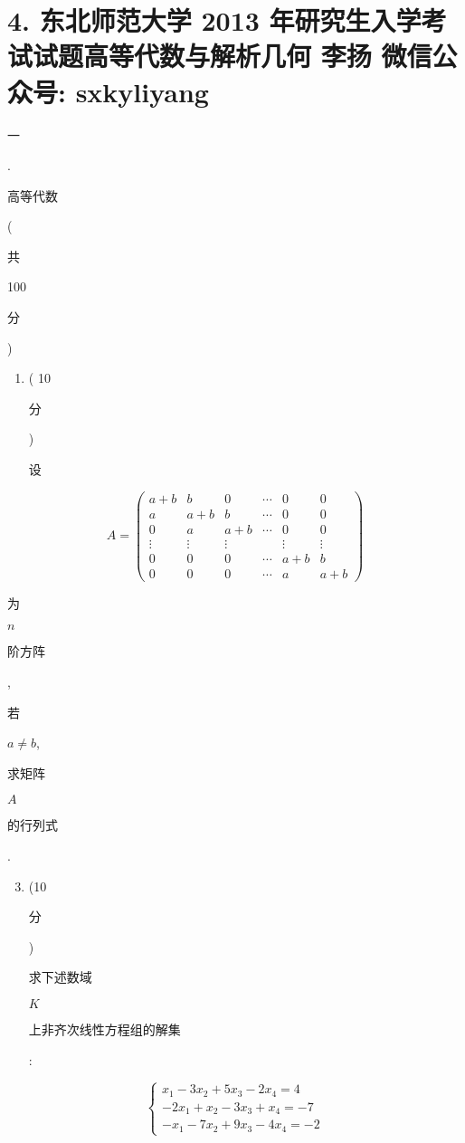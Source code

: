 \documentclass[10pt]{article}
\begin{document}
\section{4. 东北师范大学 2013 年研究生入学考试试题高等代数与解析几何 
 李扬 
 微信公众号: sxkyliyang}
\begin{CJK}{UTF8}{mj}一\end{CJK}. \begin{CJK}{UTF8}{mj}高等代数\end{CJK} (\begin{CJK}{UTF8}{mj}共\end{CJK} 100 \begin{CJK}{UTF8}{mj}分\end{CJK})

\begin{enumerate}
  \item ( 10 \begin{CJK}{UTF8}{mj}分\end{CJK}) \begin{CJK}{UTF8}{mj}设\end{CJK}
\end{enumerate}
$$
A=\left(\begin{array}{cccccc}
a+b & b & 0 & \cdots & 0 & 0 \\
a & a+b & b & \cdots & 0 & 0 \\
0 & a & a+b & \cdots & 0 & 0 \\
\vdots & \vdots & \vdots & & \vdots & \vdots \\
0 & 0 & 0 & \cdots & a+b & b \\
0 & 0 & 0 & \cdots & a & a+b
\end{array}\right)
$$
\begin{CJK}{UTF8}{mj}为\end{CJK} $n$ \begin{CJK}{UTF8}{mj}阶方阵\end{CJK}, \begin{CJK}{UTF8}{mj}若\end{CJK} $a \neq b$, \begin{CJK}{UTF8}{mj}求矩阵\end{CJK} $A$ \begin{CJK}{UTF8}{mj}的行列式\end{CJK}.

\begin{enumerate}
  \setcounter{enumi}{2}
  \item (10 \begin{CJK}{UTF8}{mj}分\end{CJK}) \begin{CJK}{UTF8}{mj}求下述数域\end{CJK} $K$ \begin{CJK}{UTF8}{mj}上非齐次线性方程组的解集\end{CJK}:
\end{enumerate}
$$
\left\{\begin{array}{l}
x_{1}-3 x_{2}+5 x_{3}-2 x_{4}=4 \\
-2 x_{1}+x_{2}-3 x_{3}+x_{4}=-7 \\
-x_{1}-7 x_{2}+9 x_{3}-4 x_{4}=-2
\end{array}\right.
$$
\end{document}
